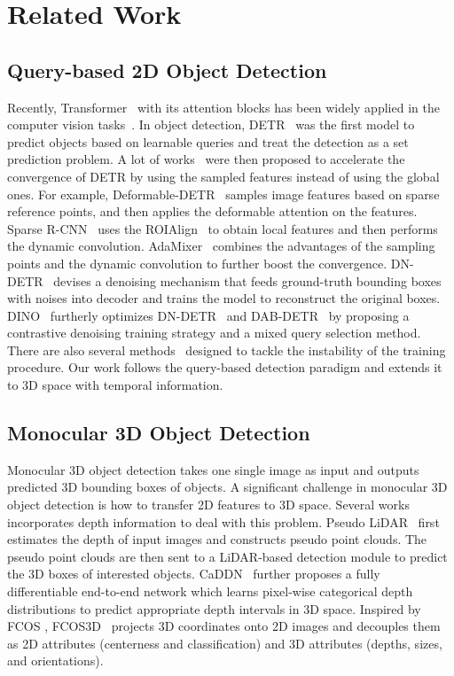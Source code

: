 \documentclass[10pt,twocolumn,letterpaper]{article}
\begin{document}
\section{Related Work}

\subsection{Query-based 2D Object Detection}

Recently, Transformer~\cite{transformer} with its attention blocks has been widely applied in the computer vision tasks~\cite{vit,segnext,detr}. In object detection, DETR~\cite{detr} was the first model to predict objects based on learnable queries and treat the detection as a set prediction problem. A lot of works~\cite{deformabledetr,sparsercnn,dabdetr,conditionaldetr,adamixer,dndetr,dinodetr} were then proposed to accelerate the convergence of DETR by using the sampled features instead of using the global ones. For example, Deformable-DETR~\cite{deformabledetr} samples image features based on sparse reference points, and then applies the deformable attention on the features. Sparse R-CNN~\cite{sparsercnn} uses the ROIAlign~\cite{maskrcnn} to obtain local features and then performs the dynamic convolution. AdaMixer~\cite{adamixer} combines the advantages of the sampling points and the dynamic convolution to further boost the convergence. DN-DETR~\cite{dndetr} devises a denoising mechanism that feeds ground-truth bounding boxes with noises into decoder and trains the model to reconstruct the original boxes. DINO~\cite{dinodetr} furtherly optimizes DN-DETR~\cite{dndetr} and DAB-DETR~\cite{dabdetr} by proposing a contrastive denoising training strategy and a mixed query selection method. There are also several methods~\cite{groupdetr, hybriddetr, stageinteractor} designed to tackle the instability of the training procedure. Our work follows the query-based detection paradigm and extends it to 3D space with temporal information.

\subsection{Monocular 3D Object Detection}

Monocular 3D object detection takes one single image as input and outputs predicted 3D bounding boxes of objects. A significant challenge in monocular 3D object detection is how to transfer 2D features to 3D space. Several works~\cite{pseudo-lidar, caddn, fcos3d, dd3d} incorporates depth information to deal with this problem. 
Pseudo LiDAR~\cite{pseudo-lidar} first estimates the depth of input images and constructs pseudo point clouds. The pseudo point clouds are then sent to a LiDAR-based detection module to predict the 3D boxes of interested objects. 
CaDDN~\cite{caddn} further proposes a fully differentiable end-to-end network which learns pixel-wise categorical depth distributions to predict appropriate depth intervals in 3D space. 
Inspired by FCOS \cite{fcos}, FCOS3D~\cite{fcos3d} projects 3D coordinates onto 2D images and decouples them as 2D attributes (centerness and classification) and 3D attributes (depths, sizes, and orientations).
\end{document}

